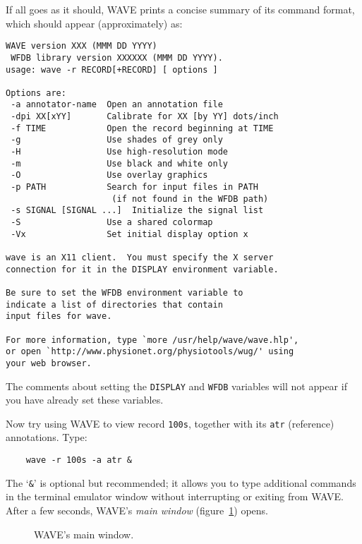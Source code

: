 \documentclass[twoside]{book}
\newcommand{\WAVE}{{\sf WAVE}\xspace}
\begin{document}
If all goes as it should, \WAVE{} prints a concise summary of its command
format, which should appear (approximately) as:
\begin{verbatim}
WAVE version XXX (MMM DD YYYY)
 WFDB library version XXXXXX (MMM DD YYYY).
usage: wave -r RECORD[+RECORD] [ options ]

Options are:
 -a annotator-name  Open an annotation file
 -dpi XX[xYY]       Calibrate for XX [by YY] dots/inch
 -f TIME            Open the record beginning at TIME
 -g                 Use shades of grey only
 -H                 Use high-resolution mode
 -m                 Use black and white only
 -O                 Use overlay graphics
 -p PATH            Search for input files in PATH
                     (if not found in the WFDB path)
 -s SIGNAL [SIGNAL ...]  Initialize the signal list
 -S                 Use a shared colormap
 -Vx                Set initial display option x

wave is an X11 client.  You must specify the X server
connection for it in the DISPLAY environment variable.

Be sure to set the WFDB environment variable to
indicate a list of directories that contain
input files for wave.

For more information, type `more /usr/help/wave/wave.hlp',
or open `http://www.physionet.org/physiotools/wug/' using
your web browser.
\end{verbatim}
\noindent
The comments about setting the {\tt DISPLAY} and {\tt WFDB} variables will not
appear if you have already set these variables.

Now try using \WAVE{} to view record {\tt 100s}, together with its
{\tt atr} (reference) annotations.  Type:
\begin{verbatim}
    wave -r 100s -a atr &
\end{verbatim}
The `{\tt \&}' is optional but recommended; it allows you to type additional
commands in the terminal emulator window without interrupting or exiting from
\WAVE{}.  After a few seconds, \WAVE{}'s \emph{main window}
(figure~\ref{fig:main-window}) opens.
\begin{htmlonly}
\end{htmlonly}
\begin{latexonly}
\end{latexonly}
\begin{figure}
\centerline{}
\caption{\WAVE{}'s main window.}
\begin{htmlonly}
\end{htmlonly}
\begin{latexonly}
\end{latexonly}
\label{fig:main-window}
\end{figure}
\end{document}
